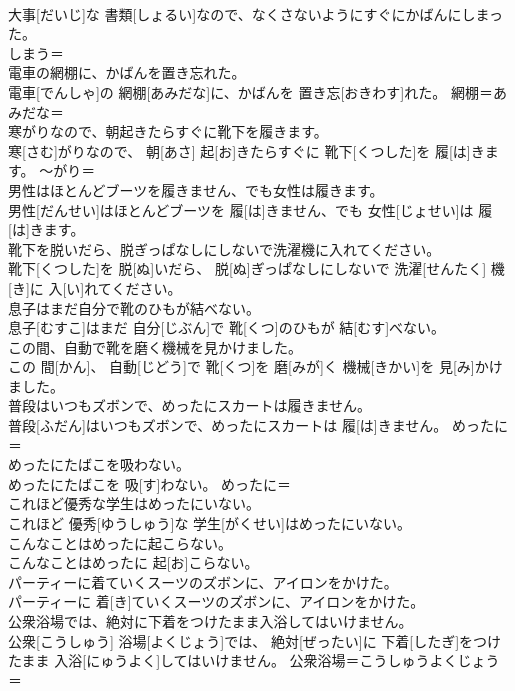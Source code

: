 \documentclass[8pt]{extreport}
\begin{document}
\begin{CJK}{UTF8}{min}
\\	大事[だいじ]な 書類[しょるい]なので、なくさないようにすぐにかばんにしまった。	
\\	しまう＝ 
\\	電車の網棚に、かばんを置き忘れた。	
\\	電車[でんしゃ]の 網棚[あみだな]に、かばんを 置き忘[おきわす]れた。	網棚＝あみだな＝ 
\\	寒がりなので、朝起きたらすぐに靴下を履きます。	
\\	寒[さむ]がりなので、 朝[あさ] 起[お]きたらすぐに 靴下[くつした]を 履[は]きます。	〜がり＝ 
\\	男性はほとんどブーツを履きません、でも女性は履きます。	
\\	男性[だんせい]はほとんどブーツを 履[は]きません、でも 女性[じょせい]は 履[は]きます。	
\\	靴下を脱いだら、脱ぎっぱなしにしないで洗濯機に入れてください。	
\\	靴下[くつした]を 脱[ぬ]いだら、 脱[ぬ]ぎっぱなしにしないで 洗濯[せんたく] 機[き]に 入[い]れてください。	
\\	息子はまだ自分で靴のひもが結べない。	
\\	息子[むすこ]はまだ 自分[じぶん]で 靴[くつ]のひもが 結[むす]べない。	
\\	この間、自動で靴を磨く機械を見かけました。	
\\	この 間[かん]、 自動[じどう]で 靴[くつ]を 磨[みが]く 機械[きかい]を 見[み]かけました。	
\\	普段はいつもズボンで、めったにスカートは履きません。	
\\	普段[ふだん]はいつもズボンで、めったにスカートは 履[は]きません。	めったに＝
\\	めったにたばこを吸わない。	
\\	めったにたばこを 吸[す]わない。	めったに＝ 
\\	これほど優秀な学生はめったにいない。	
\\	これほど 優秀[ゆうしゅう]な 学生[がくせい]はめったにいない。	
\\	こんなことはめったに起こらない。	
\\	こんなことはめったに 起[お]こらない。	
\\	パーティーに着ていくスーツのズボンに、アイロンをかけた。	
\\	パーティーに 着[き]ていくスーツのズボンに、アイロンをかけた。	
\\	公衆浴場では、絶対に下着をつけたまま入浴してはいけません。	
\\	公衆[こうしゅう] 浴場[よくじょう]では、 絶対[ぜったい]に 下着[したぎ]をつけたまま 入浴[にゅうよく]してはいけません。	公衆浴場＝こうしゅうよくじょう＝ 

\end{CJK}
\end{document}
